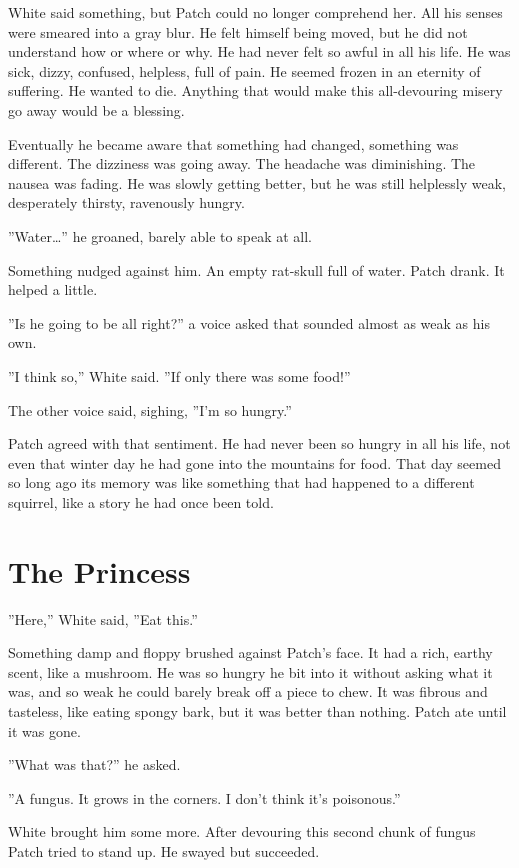 \documentclass[12pt]{book}
\begin{document}
White said something, but Patch could no longer comprehend her. All
his senses were smeared into a gray blur. He felt himself being moved,
but he did not understand how or where or why. He had never felt so
awful in all his life. He was sick, dizzy, confused, helpless, full of
pain. He seemed frozen in an eternity of suffering. He wanted to
die. Anything that would make this all-devouring misery go away would
be a blessing.

Eventually he became aware that something had changed, something was
different. The dizziness was going away. The headache was
diminishing. The nausea was fading. He was slowly getting better, but
he was still helplessly weak, desperately thirsty, ravenously hungry.

''Water\ldots{}'' he groaned, barely able to speak at all.

Something nudged against him. An empty rat-skull full of water. Patch
drank. It helped a little.

''Is he going to be all right?'' a voice asked that sounded almost as
weak as his own.

''I think so,'' White said. ''If only there was some food!''

The other voice said, sighing, ''I'm so hungry.''

Patch agreed with that sentiment. He had never been so hungry in all
his life, not even that winter day he had gone into the mountains for
food. That day seemed so long ago its memory was like something that
had happened to a different squirrel, like a story he had once been
told.


\section{The Princess}

''Here,'' White said, ''Eat this.''

Something damp and floppy brushed against Patch's face. It had a rich,
earthy scent, like a mushroom. He was so hungry he bit into it without
asking what it was, and so weak he could barely break off a piece to
chew. It was fibrous and tasteless, like eating spongy bark, but it
was better than nothing. Patch ate until it was gone.

''What was that?'' he asked.

''A fungus. It grows in the corners. I don't think it's poisonous.''

White brought him some more. After devouring this second chunk of
fungus Patch tried to stand up. He swayed but succeeded.
\end{document}

